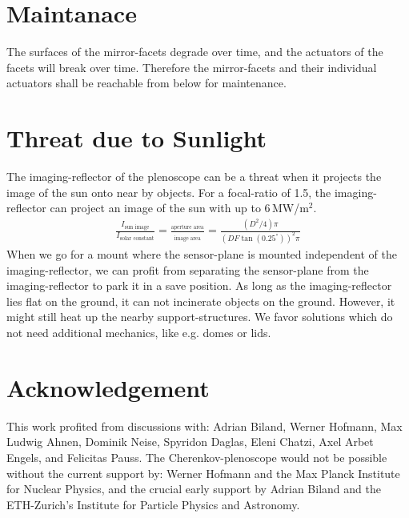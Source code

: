\documentclass[11pt,a4paper,oneside,titlepage]{article}
\begin{document}
\section{Maintanace}
%
The surfaces of the mirror-facets degrade over time, and the actuators of the facets will break over time.
%
Therefore the mirror-facets and their individual actuators shall be reachable from below for maintenance.
\section{Threat due to Sunlight}
%
The imaging-reflector of the plenoscope can be a threat when it projects the image of the sun onto near by objects.
%
For a focal-ratio of 1.5, the imaging-reflector can project an image of the sun with up to $6\,$MW/m$^2$.
%
\begin{eqnarray}
\frac{I_\text{sun image}}{I_\text{solar constant}} = \frac{_\text{aperture area}}{_\text{image area}} = \frac{(D^2/4) \pi}{(D F \tan(0.25^\circ))^2 \pi} 
\end{eqnarray}
%
When we go for a mount where the sensor-plane is mounted independent of the imaging-reflector, we can profit from separating the sensor-plane from the imaging-reflector to park it in a save position.
%
As long as the imaging-reflector lies flat on the ground, it can not incinerate objects on the ground.
%
However, it might still heat up the nearby support-structures.
%
We favor solutions which do not need additional mechanics, like e.g. domes or lids.
\section*{Acknowledgement}
%
This work profited from discussions with:
%
Adrian Biland, Werner Hofmann, Max Ludwig Ahnen, Dominik Neise, Spyridon Daglas, Eleni Chatzi, Axel Arbet Engels, and Felicitas Pauss.
%
The Cherenkov-plenoscope would not be possible without the current support by: Werner Hofmann and the Max Planck Institute for Nuclear Physics, and the crucial early support by Adrian Biland and the ETH-Zurich's Institute for Particle Physics and Astronomy.
%
%
%
%
\end{document}
